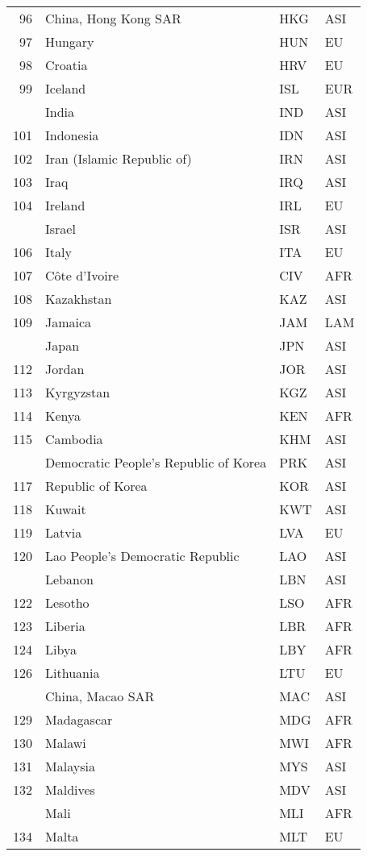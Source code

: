 \documentclass[]{article}
\begin{document}
\begin{longtable}[t]{rlll}
96 & China, Hong Kong SAR & HKG & ASI\\
97 & Hungary & HUN & EU\\
98 & Croatia & HRV & EU\\
99 & Iceland & ISL & EUR\\
\addlinespace
100 & India & IND & ASI\\
101 & Indonesia & IDN & ASI\\
102 & Iran (Islamic Republic of) & IRN & ASI\\
103 & Iraq & IRQ & ASI\\
104 & Ireland & IRL & EU\\
\addlinespace
105 & Israel & ISR & ASI\\
106 & Italy & ITA & EU\\
107 & Côte d'Ivoire & CIV & AFR\\
108 & Kazakhstan & KAZ & ASI\\
109 & Jamaica & JAM & LAM\\
\addlinespace
110 & Japan & JPN & ASI\\
112 & Jordan & JOR & ASI\\
113 & Kyrgyzstan & KGZ & ASI\\
114 & Kenya & KEN & AFR\\
115 & Cambodia & KHM & ASI\\
\addlinespace
116 & Democratic People's Republic of Korea & PRK & ASI\\
117 & Republic of Korea & KOR & ASI\\
118 & Kuwait & KWT & ASI\\
119 & Latvia & LVA & EU\\
120 & Lao People's Democratic Republic & LAO & ASI\\
\addlinespace
121 & Lebanon & LBN & ASI\\
122 & Lesotho & LSO & AFR\\
123 & Liberia & LBR & AFR\\
124 & Libya & LBY & AFR\\
126 & Lithuania & LTU & EU\\
\addlinespace
128 & China, Macao SAR & MAC & ASI\\
129 & Madagascar & MDG & AFR\\
130 & Malawi & MWI & AFR\\
131 & Malaysia & MYS & ASI\\
132 & Maldives & MDV & ASI\\
\addlinespace
133 & Mali & MLI & AFR\\
134 & Malta & MLT & EU\\

\end{longtable}
\end{document}
